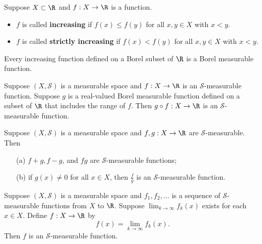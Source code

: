 \begin{definition}
    Suppose \( X \subset \R   \) and \( f: X \to \R  \) is a function. 
    \begin{itemize}
        \item \( f  \) is called \textbf{increasing} if \( f(x) \leq f(y) \) for all \( x,y \in X  \) with \( x < y  \).
        \item \( f  \) is called \textbf{strictly increasing} if \( f(x) < f(y) \) for all \( x,y \in X  \) with \( x < y \).
    \end{itemize}
\end{definition}

\begin{prop}
    Every increasing function defined on a Borel subset of \( \R  \) is a Borel measurable function.
\end{prop}

\begin{prop}
    Suppose \( (X,\mathcal{S}) \) is a measurable space and \( f: X \to \R  \) is an \( \mathcal{S} \)-measurable function. Suppose \( g  \) is a real-valued Borel measurable function defined on a subset of \( \R  \) that includes the range of \( f  \). Then \( g \circ f : X \to \R  \) is an \( \mathcal{S} \)-measurable function.
\end{prop}

\begin{prop}
    Suppose \( (X,\mathcal{S}) \) is a measurable space and \( f,g : X \to \R  \) are \( \mathcal{S} \)-measurable. Then
    \begin{enumerate}
        \item[(a)] \( f + g , f - g  \), and \( fg  \) are \( \mathcal{S} \)-measurable functions;
        \item[(b)] if \( g(x) \neq 0  \) for all \( x \in X  \), then \( \frac{ f }{ g  }  \) is an \( \mathcal{S}  \)-measurable function.
    \end{enumerate}
\end{prop}

\begin{prop}
    Suppose \( (X,\mathcal{S}) \) is a measurable space and \( {f}_{1}, {f}_{2}, \dots  \) is a sequence of \( \mathcal{S} \)-measurable functions from \( X  \) to \( \R  \). Suppose \( \lim_{ k  \to \infty  }  {f}_{k }(x) \) exists for each \( x \in X  \). Define \( f: X \to \R  \) by
    \[  f(x) = \lim_{ k  \to  \infty  }  {f}_{k }(x). \]
    Then \( f  \) is an \( \mathcal{S} \)-measurable function.
\end{prop}

